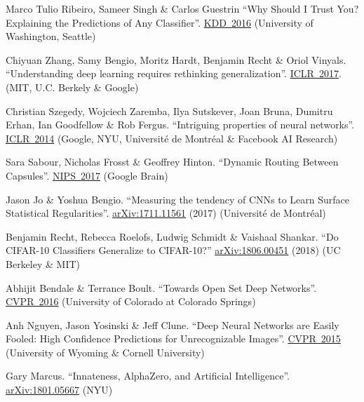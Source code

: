 \documentclass{article}
\begin{document}
\begin{thebibliography}{10}
 Marco Tulio Ribeiro, Sameer Singh \& Carlos Guestrin ``Why Should I Trust You? Explaining the Predictions of Any Classifier''. \href{http://www.kdd.org/kdd2016/papers/files/rfp0573-ribeiroA.pdf}{KDD~2016} (University of Washington, Seattle)

 Chiyuan Zhang, Samy Bengio, Moritz Hardt, Benjamin Recht \& Oriol Vinyals. ``Understanding deep learning requires rethinking generalization''. \href{https://openreview.net/forum?id=Sy8gdB9xx}{ICLR~2017}. (MIT, U.C. Berkely \& Google)

 Christian Szegedy, Wojciech Zaremba, Ilya Sutskever, Joan Bruna, Dumitru Erhan, Ian Goodfellow \& Rob Fergus. ``Intriguing properties of neural networks''. \href{https://arxiv.org/abs/1312.6199}{ICLR~2014} (Google, NYU, Universit\'e de Montr\'eal \& Facebook AI Research)

 Sara Sabour, Nicholas Frosst \& Geoffrey Hinton. ``Dynamic Routing Between Capsules''. \href{https://papers.nips.cc/paper/6975-dynamic-routing-between-capsules.pdf}{NIPS~2017} (Google Brain)

 Jason Jo \& Yoshua Bengio. ``Measuring the tendency of CNNs to Learn Surface Statistical Regularities''. \href{https://arxiv.org/abs/1711.11561}{arXiv:1711.11561} (2017) (Universit\'e de Montr\'eal) 

 Benjamin Recht, Rebecca Roelofs, Ludwig Schmidt \& Vaishaal Shankar. ``Do CIFAR-10 Classifiers Generalize to CIFAR-10?'' \href{https://arxiv.org/pdf/1806.00451.pdf}{arXiv:1806.00451} (2018) (UC Berkeley \& MIT)

 Abhijit Bendale \& Terrance Boult. ``Towards Open Set Deep Networks''. \href{https://www.cv-foundation.org/openaccess/content_cvpr_2016/papers/Bendale_Towards_Open_Set_CVPR_2016_paper.pdf}{CVPR~2016} (University of Colorado at Colorado Springs)

 Anh Nguyen, Jason Yosinski \& Jeff Clune. ``Deep Neural Networks are Easily Fooled: High Confidence Predictions for Unrecognizable Images''. \href{http://www.evolvingai.org/files/DNNsEasilyFooled_cvpr15.pdf}{CVPR~2015} (University of Wyoming \& Cornell University)

 Gary Marcus. ``Innateness, AlphaZero, and Artificial Intelligence''. \href{https://arxiv.org/pdf/1801.05667.pdf}{arXiv:1801.05667} (NYU)


\end{thebibliography}
\end{document}
